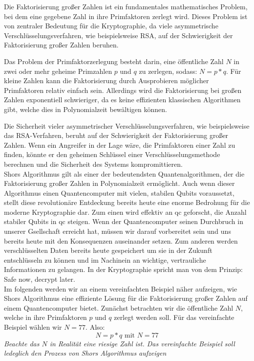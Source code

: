 Die Faktorisierung großer Zahlen \cite[S189]{bernsteinPostquantumCryptography2017} ist ein fundamentales mathematisches Problem, 
bei dem eine gegebene Zahl in ihre Primfaktoren zerlegt wird.
Dieses Problem ist von zentraler Bedeutung für die Kryptographie, da viele asymmetrische Verschlüsselungsverfahren, wie beispielsweise RSA, 
auf der Schwierigkeit der Faktorisierung großer Zahlen beruhen.

Das Problem der Primfaktorzerlegung besteht darin, eine öffentliche Zahl $N$ in zwei oder mehr geheime Primzahlen $p$ und $q$ zu zerlegen, sodass: $N = p*q$. 
Für kleine Zahlen kann die Faktorisierung durch Ausprobieren möglicher Primfaktoren relativ einfach sein. 
Allerdings wird die Faktorisierung bei großen Zahlen exponentiell schwieriger, 
da es keine effizienten klassischen Algorithmen gibt, welche dies in Polynomialzeit bewältigen können.

Die Sicherheit vieler asymmetrischer Verschlüsselungsverfahren, 
wie beispielsweise das RSA-Verfahren, beruht auf der Schwierigkeit der Faktorisierung großer Zahlen. 
Wenn ein Angreifer in der Lage wäre, die Primfaktoren einer Zahl zu finden, 
könnte er den geheimen Schlüssel einer Verschlüsselungsmethode berechnen und die Sicherheit des Systems kompromittieren.\\

Shors Algorithmus \cite{shorAlgorithmsQuantumComputation1994} gilt als einer der bedeutendsten Quantenalgorithmen, 
der die Faktorisierung großer Zahlen in Polynomialzeit ermöglicht. 
Auch wenn dieser Algorithmus einen Quantencomputer mit vielen, stabilen Qubits voraussetzt, 
stellt diese revolutionäre Entdeckung bereits heute eine enorme Bedrohung für die moderne Kryptographie dar.
Zum einen wird effektiv an \ac{qc} geforscht, die Anzahl stabiler Qubits in \ac{qc} steigen. 
Wenn der Quantencomputer seinen Durchbruch in unserer Gsellschaft erreicht hat, müssen wir darauf vorbereitet sein und uns bereits heute mit den Konsequenzen auseinander setzen. 
Zum anderen werden verschlüsselten Daten bereits heute gespeichert um sie in der Zukunft entschlüsseln zu können und 
im Nachinein an wichtige, vertrauliche Informationen zu gelangen. In der Kryptographie spricht man von dem Prinzip: \glqq Safe now, decrypt later\grqq.\\

Im folgenden \cite{kakLecture12PublicKey} werden wir an einem vereinfachten Beispiel näher aufzeigen, 
wie Shors Algorithmus eine effiziente Lösung für die Faktorisierung großer Zahlen auf einem Quantencomputer bietet.
Zunächst betrachten wir die öffentliche Zahl $N$, welche in ihre Primfaktoren $p$ und $q$ zerlegt werden soll. 
Für das vereinfachte Beispiel wählen wir $N = 77$. Also: $$N = p*q \textrm{ mit } N= 77$$
\textit{Beachte das $N$ in Realität eine riesige Zahl ist. Das vereinfachte Beispiel soll ledeglich den Prozess von Shors Algorithmus aufzeigen}

